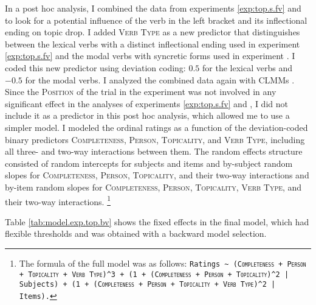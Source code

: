 In a post hoc analysis, I combined the data from experiments \ref*{exp:top.s.fv} and  to look for a potential influence of the verb in the left bracket and its inflectional ending on topic drop.
I added \textsc{Verb Type} as a new predictor that distinguishes between the lexical verbs  with a distinct inflectional ending used in experiment \ref*{exp:top.s.fv} and the modal verbs  with syncretic forms  used in experiment .
I coded this new predictor using deviation coding: $0.5$ for the lexical verbs and $-0.5$ for the modal verbs. 
I analyzed the combined data again with CLMMs \citep{christensen2019}.
Since the \textsc{Position} of the trial in the experiment was not involved in any significant effect in the analyses of experiments \ref*{exp:top.s.fv} and , I did not include it as a predictor in this post hoc analysis, which allowed me to use a simpler model.
I modeled the ordinal ratings as a function of the deviation-coded binary predictors \textsc{Completeness}, \textsc{Person}, \textsc{Topicality}, and \textsc{Verb Type}, including all three- and two-way interactions between them.
The random effects structure consisted of random intercepts for subjects and items and by-subject random slopes for \textsc{Completeness}, \textsc{Person}, \textsc{Topicality}, and their two-way interactions and by-item random slopes for \textsc{Completeness}, \textsc{Person}, \textsc{Topicality}, \textsc{Verb Type}, and their two-way interactions.%
\footnote{The formula of the full model was as follows:
\texttt{Ratings \textasciitilde ~(\textsc{Completeness} + \textsc{Person} + \textsc{Topicality} + \textsc{Verb Type})\textasciicircum3 + (1 + (\textsc{Completeness} + \textsc{Person} + \textsc{Topicality})\textasciicircum2 | Subjects) + (1 + (\textsc{Completeness} + \textsc{Person} + \textsc{Topicality} + \textsc{Verb Type})\textasciicircum2 | Items).}}
%

Table \ref{tab:model.exp.top.bv} shows the fixed effects in the final model, which had flexible thresholds and was obtained with a backward model selection.

